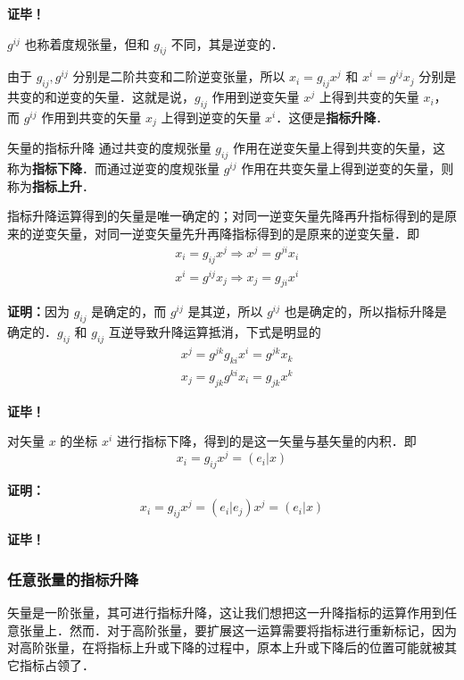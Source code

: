 \textbf{证毕！}

$g^{ij}$ 也称着度规张量，但和 $g_{ij}$ 不同，其是逆变的．

由于 $g_{ij},g^{ij}$ 分别是二阶共变和二阶逆变张量，所以 $x_i=g_{ij}x^j$ 和 $x^i=g^{ij}x_j$ 分别是共变的和逆变的矢量．这就是说，$g_{ij}$ 作用到逆变矢量 $x^j$ 上得到共变的矢量 $x_i$，而 $g^{ij}$ 作用到共变的矢量 $x_j$ 上得到逆变的矢量 $x^i$．这便是\textbf{指标升降}．
\begin{definition}{矢量的指标升降}
通过共变的度规张量 $g_{ij}$ 作用在逆变矢量上得到共变的矢量，这称为\textbf{指标下降}．而通过逆变的度规张量 $g^{ij}$ 作用在共变矢量上得到逆变的矢量，则称为\textbf{指标上升}．
\end{definition}
\begin{theorem}{}
指标升降运算得到的矢量是唯一确定的；对同一逆变矢量先降再升指标得到的是原来的逆变矢量，对同一逆变矢量先升再降指标得到的是原来的逆变矢量．即
\begin{equation}
\begin{aligned}
&x_i=g_{ij}x^j\Rightarrow x^j=g^{ji}x_i
\\
&x^i=g^{ij}x_j\Rightarrow x_j=g_{ji}x^i
\end{aligned}
\end{equation}
\end{theorem}
\textbf{证明：}因为 $g_{ij}$ 是确定的，而 $g^{ij}$ 是其逆，所以 $g^{ij}$ 也是确定的，所以指标升降是确定的．$g_{ij}$ 和 $g_{ij}$ 互逆导致升降运算抵消，下式是明显的
\begin{equation}
\begin{aligned}
&x^j=g^{jk}g_{ki}x^i=g^{jk}x_k\\
&x_j=g_{jk}g^{ki}x_i=g_{jk}x^k
\end{aligned}
\end{equation}

\textbf{证毕！}
\begin{theorem}{}
对矢量 $x$ 的坐标 $x^i$ 进行指标下降，得到的是这一矢量与基矢量的内积．即
\begin{equation}
x_i=g_{ij}x^j=(e_i|x)
\end{equation}
\end{theorem}
\textbf{证明：}
\begin{equation}
x_i=g_{ij}x^j=(e_i|e_j)x^j=(e_i|x)
\end{equation}

\textbf{证毕！}
\subsubsection{任意张量的指标升降}
矢量是一阶张量，其可进行指标升降，这让我们想把这一升降指标的运算作用到任意张量上．然而．对于高阶张量，要扩展这一运算需要将指标进行重新标记，因为对高阶张量，在将指标上升或下降的过程中，原本上升或下降后的位置可能就被其它指标占领了．

